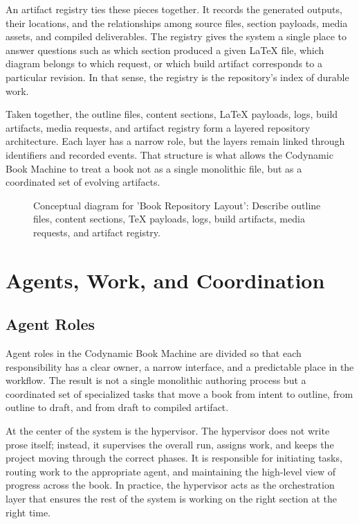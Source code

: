 \documentclass[11pt]{article}
\begin{document}
An artifact registry ties these pieces together. It records the generated outputs, their locations, and the relationships among source files, section payloads, media assets, and compiled deliverables. The registry gives the system a single place to answer questions such as which section produced a given \LaTeX{} file, which diagram belongs to which request, or which build artifact corresponds to a particular revision. In that sense, the registry is the repository's index of durable work.

Taken together, the outline files, content sections, \LaTeX{} payloads, logs, build artifacts, media requests, and artifact registry form a layered repository architecture. Each layer has a narrow role, but the layers remain linked through identifiers and recorded events. That structure is what allows the Codynamic Book Machine to treat a book not as a single monolithic file, but as a coordinated set of evolving artifacts.

\begin{figure}[htbp]
\centering

\caption{Conceptual diagram for 'Book Repository Layout': Describe outline files, content sections, TeX payloads, logs, build artifacts, media requests, and artifact registry.}
\end{figure}



\section{Agents, Work, and Coordination}

\subsection{Agent Roles}


Agent roles in the Codynamic Book Machine are divided so that each responsibility has a clear owner, a narrow interface, and a predictable place in the workflow. The result is not a single monolithic authoring process but a coordinated set of specialized tasks that move a book from intent to outline, from outline to draft, and from draft to compiled artifact.

At the center of the system is the hypervisor. The hypervisor does not write prose itself; instead, it supervises the overall run, assigns work, and keeps the project moving through the correct phases. It is responsible for initiating tasks, routing work to the appropriate agent, and maintaining the high-level view of progress across the book. In practice, the hypervisor acts as the orchestration layer that ensures the rest of the system is working on the right section at the right time.
\end{document}
